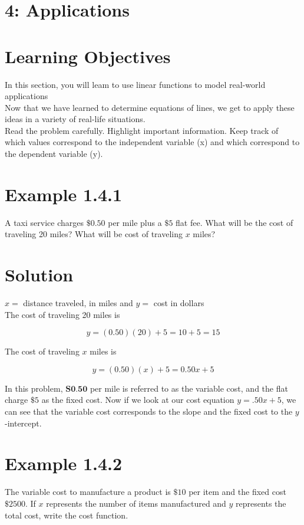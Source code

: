 \section*{4: Applications}
\section*{Learning Objectives}
In this section, you will leam to use linear functions to model real-world applications\\
Now that we have learned to determine equations of lines, we get to apply these ideas in a variety of real-life situations.\\
Read the problem carefully. Highlight important information. Keep track of which values correspond to the independent variable (x) and which correspond to the dependent variable (y).

\section*{Example 1.4.1}
A taxi service charges $\$ 0.50$ per mile plus a $\$ 5$ flat fee. What will be the cost of traveling 20 miles? What will be cost of traveling $x$ miles?

\section*{Solution}
$x=$ distance traveled, in miles and $y=$ cost in dollars\\
The cost of traveling 20 miles is

$$
y=(0.50)(20)+5=10+5=15
$$

The cost of traveling $x$ miles is

$$
y=(0.50)(x)+5=0.50 x+5
$$

In this problem, $\mathbf{S 0 . 5 0}$ per mile is referred to as the variable cost, and the flat charge $\$ 5$ as the fixed cost. Now if we look at our cost equation $y=.50 x+5$, we can see that the variable cost corresponds to the slope and the fixed cost to the $y$-intercept.

\section*{Example 1.4.2}
The variable cost to manufacture a product is $\$ 10$ per item and the fixed cost $\$ 2500$. If $x$ represents the number of items manufactured and $y$ represents the total cost, write the cost function.

